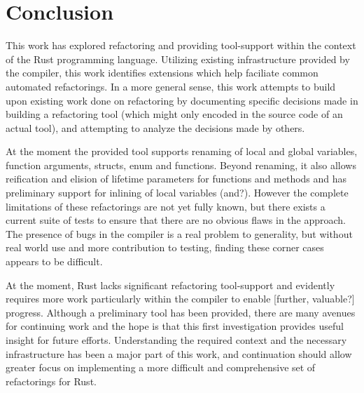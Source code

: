 \chapter{Conclusion}\label{C:con}
This work has explored refactoring and providing tool-support within the context of the Rust programming language. Utilizing existing infrastructure provided by the compiler, this work identifies extensions which help faciliate common automated refactorings. In a more general sense, this work attempts to build upon existing work done on refactoring by documenting specific decisions made in building a refactoring tool (which might only encoded in the source code of an actual tool), and attempting to analyze the decisions made by others.


At the moment the provided tool supports renaming of local and global variables, function arguments, structs, enum and functions. Beyond renaming, it also allows reification and elision of lifetime parameters for functions and methods and has preliminary support for inlining of local variables (and?). However the complete limitations of these refactorings are not yet fully known, but there exists a current suite of tests to ensure that there are no obvious flaws in the approach. The presence of bugs in the compiler is a real problem to generality, but without real world use and more contribution to testing, finding these corner cases appears to be difficult.

At the moment, Rust lacks significant refactoring tool-support and evidently requires more work particularly within the compiler to enable [further, valuable?] progress. Although a preliminary tool has been provided, there are many avenues for continuing work and the hope is that this first investigation provides useful insight for future efforts. Understanding the required context and the necessary infrastructure has been a major part of this work, and continuation should allow greater focus on implementing a more difficult and comprehensive set of refactorings for Rust.